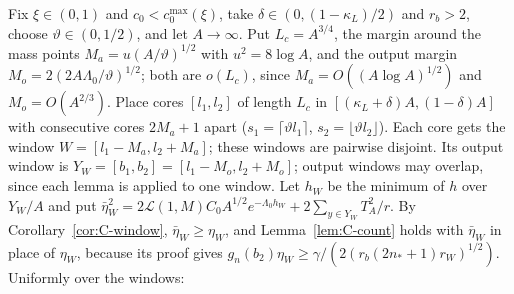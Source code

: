 \documentclass[10pt,letterpaper]{article}
\begin{document}
Fix $\xi\in(0,1)$ and $c_0<c_{0}^{\max}(\xi)$, take $\delta\in(0,(1-\kappa_L)/2)$ and $r_b>2$, choose $\vartheta\in(0,1/2)$, and let $A\to\infty$. Put
$L_c=A^{3/4}$, the margin around the mass points $M_a=u(A/\vartheta)^{1/2}$ with $u^2=8\log A$, and the output margin
$M_o=2(2A\Lambda_0/\vartheta)^{1/2}$; both are $o(L_c)$, since $M_a=O((A\log A)^{1/2})$ and $M_o=O(A^{2/3})$. Place cores $[l_1,l_2]$ of
length $L_c$ in $[(\kappa_L+\delta)A,(1-\delta)A]$ with consecutive cores $2M_a+1$ apart ($s_1=\lceil\vartheta l_1\rceil$,
$s_2=\lfloor\vartheta l_2\rfloor$). Each core gets the window $W=[l_1-M_a,l_2+M_a]$; these windows are pairwise disjoint. Its output
window is $Y_W=[b_1,b_2]=[l_1-M_o,l_2+M_o]$; output windows may overlap, since each lemma is applied to one window. Let $h_W$ be the
minimum of $h$ over $Y_W/A$ and put
$\bar\eta_W^2=2\mathcal L(1,M)C_0A^{1/2}e^{-\Lambda_0h_W}+2\sum_{y\in Y_W}T_A^2/r$. By Corollary~\ref{cor:C-window}, $\bar\eta_W\ge\eta_W$, and
Lemma~\ref{lem:C-count} holds with $\bar\eta_W$ in place of $\eta_W$, because its proof gives
$g_n(b_2)\eta_W\ge\gamma/(2(r_b(2n_*+1)r_W)^{1/2})$. Uniformly over the windows:
\end{document}
